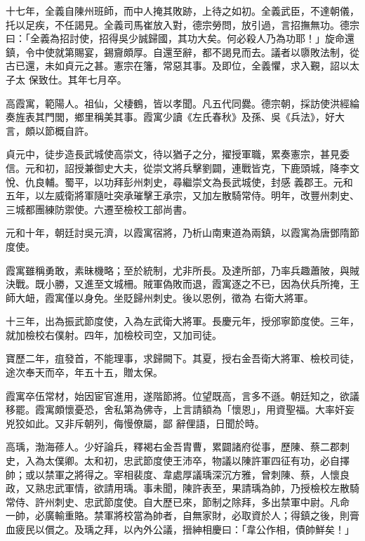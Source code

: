 \begin{pinyinscope}
 十七年，全義自陳州班師，而中人掩其敗跡，上待之如初。全義武臣，不達朝儀，托以足疾，不任謁見。全義司馬崔放入對，德宗勞問，放引過，言招撫無功。德宗曰：「全義為招討使，招得吳少誠歸國，其功大矣。何必殺人乃為功耶！」旋命還鎮，令中使就第賜宴，錫齎頗厚。自還至辭，都不謁見而去。議者以隳敗法制，從古已還，未如貞元之甚。憲宗在籓，常惡其事。及即位，全義懼，求入覲，詔以太子太
 保致仕。其年七月卒。



 高霞寓，範陽人。祖仙，父棲鶴，皆以孝聞。凡五代同爨。德宗朝，採訪使洪經綸奏旌表其門閭，鄉里稱美其事。霞寓少讀《左氏春秋》及孫、吳《兵法》，好大言，頗以節概自許。



 貞元中，徒步造長武城使高崇文，待以猶子之分，擢授軍職，累奏憲宗，甚見委信。元和初，詔授兼御史大夫，從崇文將兵擊劉闢，連戰皆克，下鹿頭城，降李文悅、仇良輔。蜀平，以功拜彭州刺史，尋繼崇文為長武城使，封感
 義郡王。元和五年，以左威衛將軍隨吐突承璀擊王承宗，又加左散騎常侍。明年，改豐州刺史、三城都團練防禦使。六遷至檢校工部尚書。



 元和十年，朝廷討吳元濟，以霞寓宿將，乃析山南東道為兩鎮，以霞寓為唐鄧隋節度使。



 霞寓雖稱勇敢，素昧機略；至於統制，尤非所長。及達所部，乃率兵趣蕭陂，與賊決戰。既小勝，又進至文城柵。賊軍偽敗而退，霞寓逐之不已，因為伏兵所掩，王師大衄，霞寓僅以身免。坐貶歸州刺史。後以恩例，徵為
 右衛大將軍。



 十三年，出為振武節度使，入為左武衛大將軍。長慶元年，授邠寧節度使。三年，就加檢校右僕射。四年，加檢校司空，又加司徒。



 寶歷二年，疽發首，不能理事，求歸闕下。其夏，授右金吾衛大將軍、檢校司徒，途次奉天而卒，年五十五，贈太保。



 霞寓卒伍常材，始因宦官進用，遂階節將。位望既高，言多不遜。朝廷知之，欲議移罷。霞寓頗懷憂恐，舍私第為佛寺，上言請額為「懷恩」，用資聖福。大率奸妄兇狡如此。又非斥朝列，侮慢僚屬，鄙
 辭俚語，日聞於時。



 高瑀，渤海蓚人。少好論兵，釋褐右金吾胄曹，累闢諸府從事，歷陳、蔡二郡刺史，入為太僕卿。太和初，忠武節度使王沛卒，物議以陳許軍四征有功，必自擇帥；或以禁軍之將得之。宰相裴度、韋處厚議瑀深沉方雅，曾刺陳、蔡，人懷良政，又熟忠武軍情，欲請用瑀。事未聞，陳許表至，果請瑀為帥，乃授檢校左散騎常侍、許州刺史、忠武節度使。自大歷已來，節制之除拜，多出禁軍中尉。凡命
 一帥，必廣輸重賂。禁軍將校當為帥者，自無家財，必取資於人；得鎮之後，則膏血疲民以償之。及瑀之拜，以內外公議，搢紳相慶曰：「韋公作相，債帥鮮矣！」




\end{pinyinscope}
